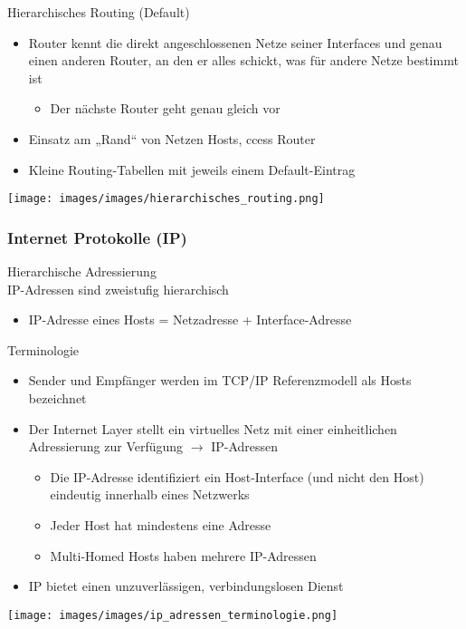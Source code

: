 \begin{concept}{Hierarchisches Routing (Default)}
    \begin{itemize}
        \item Router kennt die direkt angeschlossenen Netze seiner Interfaces und genau einen anderen Router, an den er alles schickt, was für andere Netze bestimmt ist
        \begin{itemize}
            \item Der nächste Router geht genau gleich vor
        \end{itemize}
        \item Einsatz am „Rand“ von Netzen Hosts, ccess Router
        \item Kleine Routing-Tabellen mit jeweils einem Default-Eintrag
    \end{itemize}
        \texttt{[image: images/images/hierarchisches\_routing.png]}
\end{concept}

\columnbreak 

\subsubsection{Internet Protokolle (IP)}

\begin{definition}{Hierarchische Adressierung}\\
IP-Adressen sind zweistufig hierarchisch
\begin{itemize}
    \item IP-Adresse eines Hosts = Netzadresse + Interface-Adresse
\end{itemize}
\end{definition}

\begin{definition}{Terminologie}
    \begin{itemize}
        \item Sender und Empfänger werden im TCP/IP Referenzmodell als Hosts bezeichnet
        \item Der Internet Layer stellt ein virtuelles Netz mit einer einheitlichen Adressierung zur Verfügung $\rightarrow$ IP-Adressen
        \begin{itemize}
            \item Die IP-Adresse identifiziert ein Host-Interface (und nicht den Host) eindeutig innerhalb eines Netzwerks
            \item Jeder Host hat mindestens eine Adresse
            \item Multi-Homed Hosts haben mehrere IP-Adressen
        \end{itemize}
        \item IP bietet einen unzuverlässigen, verbindungslosen Dienst
    \end{itemize}
    \texttt{[image: images/images/ip\_adressen\_terminologie.png]}
\end{definition}

